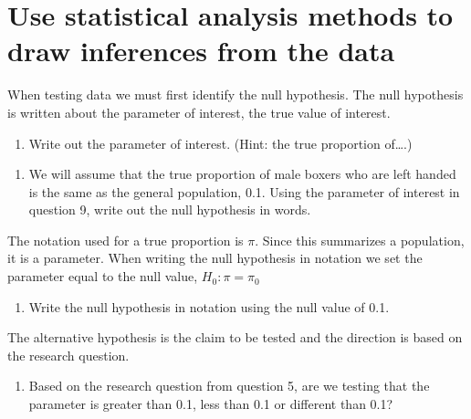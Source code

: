 \documentclass[
]{report}
\providecommand{\tightlist}{%
  \setlength{\itemsep}{0pt}\setlength{\parskip}{0pt}}
\begin{document}
\vspace{0.5in}

\hypertarget{use-statistical-analysis-methods-to-draw-inferences-from-the-data}{%
\section{Use statistical analysis methods to draw inferences from the data}\label{use-statistical-analysis-methods-to-draw-inferences-from-the-data}}

When testing data we must first identify the null hypothesis. The null hypothesis is written about the parameter of interest, the true value of interest.

\begin{enumerate}
\def\labelenumi{\arabic{enumi}.}
\setcounter{enumi}{8}
\tightlist
\item
  Write out the parameter of interest. (Hint: the true proportion of\ldots.)
\end{enumerate}

\vspace{1in}

\begin{enumerate}
\def\labelenumi{\arabic{enumi}.}
\setcounter{enumi}{9}
\tightlist
\item
  We will assume that the true proportion of male boxers who are left handed is the same as the general population, 0.1. Using the parameter of interest in question 9, write out the null hypothesis in words.
\end{enumerate}

\vspace{1in}

The notation used for a true proportion is \(\pi\). Since this summarizes a population, it is a parameter. When writing the null hypothesis in notation we set the parameter equal to the null value, \(H_0: \pi = \pi_0\)

\begin{enumerate}
\def\labelenumi{\arabic{enumi}.}
\setcounter{enumi}{10}
\tightlist
\item
  Write the null hypothesis in notation using the null value of 0.1.
\end{enumerate}

\vspace{0.5in}

The alternative hypothesis is the claim to be tested and the direction is based on the research question.

\begin{enumerate}
\def\labelenumi{\arabic{enumi}.}
\setcounter{enumi}{11}
\tightlist
\item
  Based on the research question from question 5, are we testing that the parameter is greater than 0.1, less than 0.1 or different than 0.1?
\end{enumerate}
\end{document}
